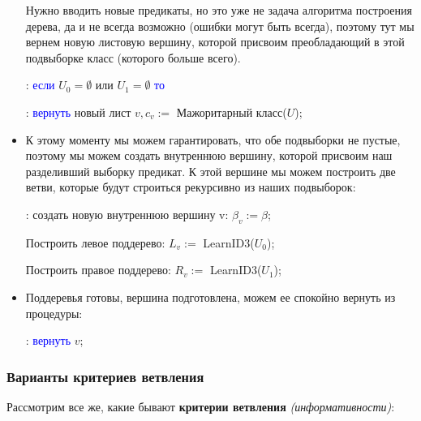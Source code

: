 \documentclass{article}
\begin{document}
\begin{itemize}
Нужно вводить новые предикаты, но это уже не задача алгоритма построения дерева, да и не всегда возможно (ошибки могут быть всегда), поэтому тут мы вернем новую листовую вершину, которой присвоим преобладающий в этой подвыборке класс (которого больше всего).

: \textcolor{blue}{если}
				$U_0 = \emptyset$ или $U_1 = \emptyset$
			\textcolor{blue}{то}
			
: \qquad \textcolor{blue}{вернуть} новый лист $v, c_v :=$ Мажоритарный класс($U$);

\item К этому моменту мы можем гарантировать, что обе подвыборки не пустые, поэтому мы можем создать внутреннюю вершину, которой присвоим наш разделивший выборку предикат. К этой вершине мы можем построить две ветви, которые будут строиться рекурсивно из наших подвыборок:

: создать новую внутреннюю вершину v: $\beta_v := \beta$;

\qquad \qquad	Построить левое поддерево: $L_v :=$ LearnID3($U_0$);

\qquad \qquad	Построить правое поддерево: $R_v :=$ LearnID3($U_1$);

\item Поддеревья готовы, вершина подготовлена, можем ее спокойно вернуть из процедуры:

: \textcolor{blue}{вернуть} $v$;

\end{itemize}

\subsubsection{Варианты критериев ветвления}

Рассмотрим все же, какие бывают \textbf{критерии ветвления} \textit{(информативности)}:
\end{document}
